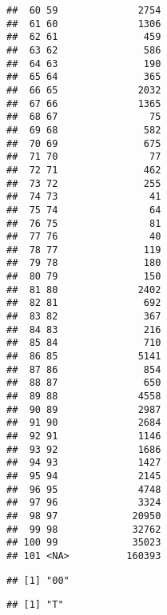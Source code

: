 \documentclass[
]{article}
\begin{document}
\begin{verbatim}
##  60 59              2754
##  61 60              1306
##  62 61               459
##  63 62               586
##  64 63               190
##  65 64               365
##  66 65              2032
##  67 66              1365
##  68 67                75
##  69 68               582
##  70 69               675
##  71 70                77
##  72 71               462
##  73 72               255
##  74 73                41
##  75 74                64
##  76 75                81
##  77 76                40
##  78 77               119
##  79 78               180
##  80 79               150
##  81 80              2402
##  82 81               692
##  83 82               367
##  84 83               216
##  85 84               710
##  86 85              5141
##  87 86               854
##  88 87               650
##  89 88              4558
##  90 89              2987
##  91 90              2684
##  92 91              1146
##  93 92              1686
##  94 93              1427
##  95 94              2145
##  96 95              4748
##  97 96              3324
##  98 97             20950
##  99 98             32762
## 100 99             35023
## 101 <NA>          160393
\end{verbatim}

\begin{verbatim}
## [1] "00"
\end{verbatim}

\begin{verbatim}
## [1] "T"
\end{verbatim}
\end{document}
